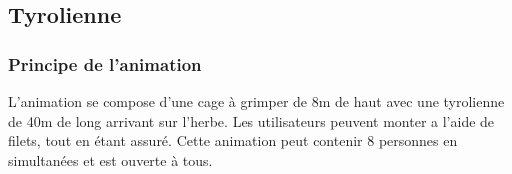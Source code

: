 \documentclass[hidelinks, paper=a4, fontsize=13pt]{report}
\begin{document}
%
%	
%

\subsection{Tyrolienne}
\label{tyrolienne}
\subsubsection{Principe de l’animation}

L’animation se compose d’une cage à grimper de 8m de haut avec une tyrolienne de 40m de long arrivant sur l’herbe. Les utilisateurs peuvent monter a l’aide de filets, tout en étant assuré. Cette animation peut contenir 8 personnes en simultanées et est ouverte à tous.
\end{document}
